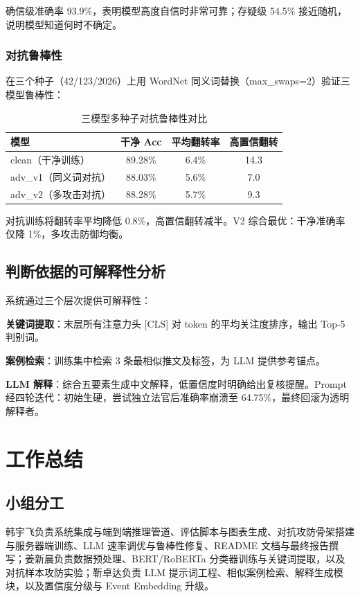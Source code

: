 \documentclass[10pt,conference]{IEEEtran}
\newcommand{\tabfont}{\footnotesize}
\begin{document}
确信级准确率 93.9\%，表明模型高度自信时非常可靠；存疑级 54.5\% 接近随机，说明模型知道何时不确定。

\subsubsection{对抗鲁棒性}

在三个种子（42/123/2026）上用 WordNet 同义词替换（max\_swaps=2）验证三模型鲁棒性：

\begin{table}[H]
\centering
\caption{三模型多种子对抗鲁棒性对比}
\label{tab:adv}
\tabfont
\begin{tabular}{@{}lccc@{}}
\toprule
模型 & 干净 Acc & 平均翻转率 & 高置信翻转 \\
\midrule
clean（干净训练） & 89.28\% & 6.4\% & 14.3 \\
adv\_v1（同义词对抗） & 88.03\% & 5.6\% & 7.0 \\
adv\_v2（多攻击对抗） & 88.28\% & 5.7\% & 9.3 \\
\bottomrule
\end{tabular}
\end{table}

对抗训练将翻转率平均降低 0.8\%，高置信翻转减半。V2 综合最优：干净准确率仅降 1\%，多攻击防御均衡。

\subsection{判断依据的可解释性分析}

系统通过三个层次提供可解释性：

\textbf{关键词提取}：末层所有注意力头 [CLS] 对 token 的平均关注度排序，输出 Top-5 判别词。

\textbf{案例检索}：训练集中检索 3 条最相似推文及标签，为 LLM 提供参考锚点。

\textbf{LLM 解释}：综合五要素生成中文解释，低置信度时明确给出复核提醒。Prompt 经四轮迭代：初始生硬，尝试独立法官后准确率崩溃至 64.75\%，最终回滚为透明解释者。

\section{工作总结}

\subsection{小组分工}

韩宇飞负责系统集成与端到端推理管道、评估脚本与图表生成、对抗攻防骨架搭建与服务器端训练、LLM 速率调优与鲁棒性修复、README 文档与最终报告撰写；姜新晨负责数据预处理、BERT/RoBERTa 分类器训练与关键词提取，以及对抗样本攻防实验；靳卓达负责 LLM 提示词工程、相似案例检索、解释生成模块，以及置信度分级与 Event Embedding 升级。
\end{document}
